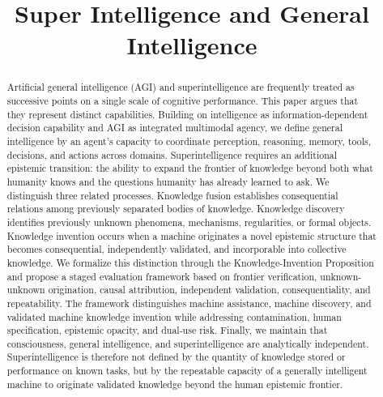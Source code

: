 \documentclass[conference]{IEEEtran}
\begin{document}
\title{Super Intelligence and General Intelligence\\
}

\author{
}

\maketitle

\begin{abstract}
Artificial general intelligence (AGI) and superintelligence are frequently treated as successive points on a single scale of cognitive performance. This paper argues that they represent distinct capabilities. Building on intelligence as information-dependent decision capability and AGI as integrated multimodal agency, we define general intelligence by an agent’s capacity to coordinate perception, reasoning, memory, tools, decisions, and actions across domains. Superintelligence requires an additional epistemic transition: the ability to expand the frontier of knowledge beyond both what humanity knows and the questions humanity has already learned to ask. We distinguish three related processes. Knowledge fusion establishes consequential relations among previously separated bodies of knowledge. Knowledge discovery identifies previously unknown phenomena, mechanisms, regularities, or formal objects. Knowledge invention occurs when a machine originates a novel epistemic structure that becomes consequential, independently validated, and incorporable into collective knowledge. We formalize this distinction through the Knowledge-Invention Proposition and propose a staged evaluation framework based on frontier verification, unknown-unknown origination, causal attribution, independent validation, consequentiality, and repeatability. The framework distinguishes machine assistance, machine discovery, and validated machine knowledge invention while addressing contamination, human specification, epistemic opacity, and dual-use risk. Finally, we maintain that consciousness, general intelligence, and superintelligence are analytically independent. Superintelligence is therefore not defined by the quantity of knowledge stored or performance on known tasks, but by the repeatable capacity of a generally intelligent machine to originate validated knowledge beyond the human epistemic frontier.
\end{abstract}
\end{document}
